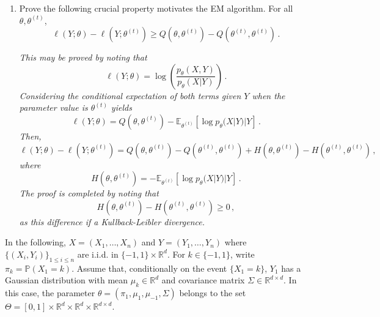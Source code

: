 \documentclass[a4paper,10pt,fleqn]{article}
\newcommand{\eqsp}{\,}
\newcommand{\rset}{\ensuremath{\mathbb{R}}}
\newcommand{\bP}{\mathbb{P}}
\newcommand{\1}{\ensuremath{\mathbbm{1}}}
\begin{document}
\begin{enumerate}
\item Prove the following crucial property motivates the EM algorithm.  For all $\theta,\theta^{(t)}$,
$$
\ell(Y;\theta) - \ell(Y;\theta^{(t)}) \geqslant Q(\theta,\theta^{(t)})-Q(\theta^{(t)},\theta^{(t)})\eqsp.
$$


\vspace{.2cm}

{\em
This may be proved by noting that
$$
\ell(Y;\theta) = \log \left(\frac{p_{\theta}(X,Y)}{p_{\theta}(X|Y)}\right)\eqsp.
$$
Considering the conditional expectation of both terms given $Y$ when the parameter value is $\theta^{(t)}$ yields
$$
\ell(Y;\theta) = Q(\theta,\theta^{(t)}) - \mathbb{E}_{\theta^{(t)}}[\log p_{\theta}(X|Y)|Y]\eqsp.
$$
Then,
$$
\ell(Y;\theta) - \ell(Y;\theta^{(t)}) = Q(\theta,\theta^{(t)})-Q(\theta^{(t)},\theta^{(t)}) + H(\theta,\theta^{(t)}) - H(\theta^{(t)},\theta^{(t)})\eqsp,
$$
where
$$
H(\theta,\theta^{(t)}) = - \mathbb{E}_{\theta^{(t)}}[\log p_{\theta}(X|Y)|Y]\eqsp.
$$
The proof is completed by noting that
$$
H(\theta,\theta^{(t)}) - H(\theta^{(t)},\theta^{(t)})\geqslant 0\eqsp,
$$
as this difference if a Kullback-Leibler divergence. 
}
\end{enumerate}
In the following, $X = (X_1,\ldots,X_n)$ and $Y = (Y_1,\ldots,Y_n)$ where $\{(X_i,Y_i)\}_{1\leqslant i\leqslant n}$  are i.i.d. in $\{-1,1\} \times \rset^d$. For $k\in\{-1,1\}$, write $\pi_k = \bP(X_1 = k)$. Assume that, conditionally on the event $\{X_1 = k\}$, $Y_1$ has a Gaussian distribution with mean $\mu_k \in\rset^d$ and covariance matrix $\Sigma\in \rset^{d\times d}$. In this case, the parameter $\theta=(\pi_1, \mu_1,\mu_{-1}, \Sigma)$ belongs to the set $\Theta= [0,1] \times \rset^d \times \rset^d \times \rset^{d \times d}$.
\end{document}
